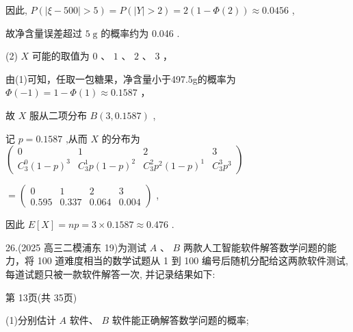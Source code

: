 \documentclass[10pt]{article}
\begin{document}
因此, \(P\left( {\left| {\xi  - {500}}\right|  > 5}\right)  = P\left( {\left| Y\right|  > 2}\right)  = 2\left( {1 - \Phi \left( 2\right) }\right)  \approx  {0.0456}\) ,

故净含量误差超过 \(5\mathrm{\;g}\) 的概率约为 0.046 .

(2) \(X\) 可能的取值为 \(0\text{ 、 }1\text{ 、 }2\text{ 、 }3\) ，

由(1)可知，任取一包糖果，净含量小于497.5g的概率为 \(\Phi \left( {-1}\right)  = 1 - \Phi \left( 1\right)  \approx  {0.1587}\) ，

故 \(X\) 服从二项分布 \(B\left( {3,{0.1587}}\right)\) ,

记 \(p = {0.1587}\) ,从而 \(X\) 的分布为 \(\left( \begin{matrix} 0 & 1 & 2 & 3 \\  {C}_{3}^{0}{\left( 1 - p\right) }^{3} & {C}_{3}^{1}p{\left( 1 - p\right) }^{2} & {C}_{3}^{2}{p}^{2}{\left( 1 - p\right) }^{1} & {C}_{3}^{3}{p}^{3} \end{matrix}\right)\)

\(= \left( \begin{matrix} 0 & 1 & 2 & 3 \\  {0.595} & {0.337} & {0.064} & {0.004} \end{matrix}\right)\) ,

因此 \(E\left\lbrack  X\right\rbrack   = {np} = 3 \times  {0.1587} \approx  {0.476}\) .

26.(2025 高三二模浦东 19)为测试 \(A\) 、 \(B\) 两款人工智能软件解答数学问题的能力，将 100 道难度相当的数学试题从 1 到 100 编号后随机分配给这两款软件测试, 每道试题只被一款软件解答一次, 并记录结果如下:

第 13页(共 35页)

\begin{center}
\end{center}

(1)分别估计 \(A\) 软件、 \(B\) 软件能正确解答数学问题的概率;
\end{document}
